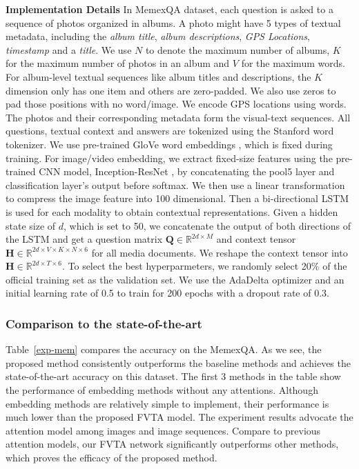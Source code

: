 \noindent\textbf{Implementation Details}
\label{sec-impl}
In MemexQA dataset, each question is asked to a sequence of photos organized in albums. A photo might have 5 types of textual metadata, including the \textit{album title}, \textit{album descriptions},  \textit{GPS Locations}, \textit{timestamp} and a \textit{title}. We use  $N$ to denote the maximum number of albums, $K$ for the maximum number of photos in an album and $V$ for the maximum words. For album-level textual sequences like album titles and descriptions, the $K$ dimension only has one item and others are zero-padded. We also use zeros to pad those positions with no word/image.
We encode GPS locations using words.
The photos and their corresponding metadata form the visual-text sequences. All questions, textual context and answers are tokenized using the Stanford word tokenizer. We use pre-trained GloVe word embeddings \cite{pennington2014glove}, which is fixed during training.
For image/video embedding, we extract fixed-size features using the pre-trained CNN model, Inception-ResNet \cite{szegedy2017inception}, by concatenating the pool5 layer and classification layer's output before softmax. We then use a linear transformation to compress the image feature into 100 dimensional.
Then a bi-directional LSTM is used for each modality to obtain contextual representations. Given a hidden state size of $d$,  which is set to 50, we concatenate the output of both directions of the LSTM and get a question matrix $\mathbf{Q} \in \mathbb{R}^{2d \times M}$
and context tensor $\mathbf{H} \in \mathbb{R}^{2d \times V \times K \times N \times 6}$ for all media documents. 
We reshape the context tensor into $\mathbf{H} \in \mathbb{R}^{2d \times T \times 6}$. 
To select the best hyperparmeters, we randomly select 20\% of the official training set as the validation set.
We use the AdaDelta \cite{zeiler2012adadelta} optimizer and an initial learning rate of 0.5 to train for 200 epochs with a dropout rate of 0.3.





\subsubsection{Comparison to the state-of-the-art} \label{FVT_comp_exp}

Table~\ref{exp-mem} compares the accuracy on the MemexQA. As we see, the proposed method consistently outperforms the baseline methods and achieves the state-of-the-art accuracy on this dataset. The first 3 methods in the table show the performance of embedding methods without any attentions. Although embedding methods are relatively simple to implement, their performance is much lower than the proposed FVTA model. The experiment results advocate the attention model among images and image sequences. Compare to previous attention models, our FVTA network significantly outperforms other methods, which proves the efficacy of the proposed method.










